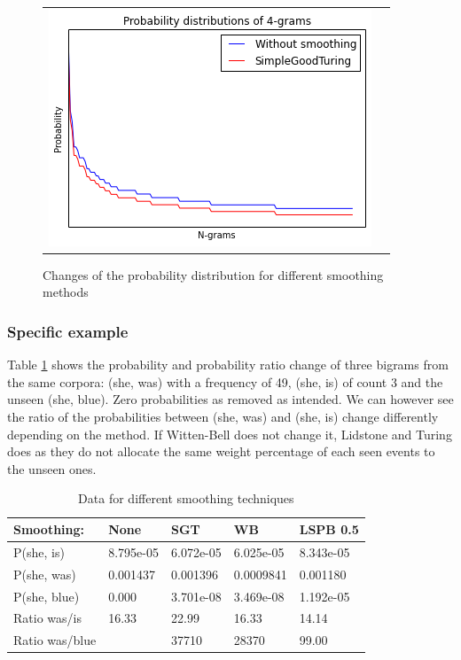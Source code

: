 \documentclass[a4paper,12pt]{article}
\begin{document}
\begin{figure}
\begin{tabular}{cc}
		\includegraphics[width=0.52\linewidth]{4_Turing} \\
	\end{tabular}
	\caption{Changes of the probability distribution for different smoothing methods}
\end{figure}

\subsubsection{Specific example}
	Table \ref{tab:smoothingprobs} shows the probability and probability ratio change of three bigrams from the same corpora: (she, was) with a frequency of 49, (she, is) of count 3 and the unseen (she, blue). Zero probabilities as removed as intended. We can however see the ratio of the probabilities between (she, was) and (she, is) change differently depending on the method. If Witten-Bell does not change it, Lidstone and Turing does as they do not allocate the same weight percentage of each seen events to the unseen ones.


\begin{table}[!h]
\centering
\caption{Data for different smoothing techniques}
\label{tab:smoothingprobs}
\begin{tabular}{@{}lllll@{}}
\toprule
Smoothing:     & None      & SGT       & WB        & LSPB 0.5   \\ \midrule
P(she, is)     & 8.795e-05 & 6.072e-05 & 6.025e-05 & 8.343e-05  \\
P(she, was)    & 0.001437  & 0.001396  & 0.0009841 & 0.001180   \\
P(she, blue)   & 0.000     & 3.701e-08 & 3.469e-08 & 1.192e-05  \\
Ratio was/is   & 16.33     & 22.99     & 16.33     & 14.14      \\
Ratio was/blue &           & 37710     & 28370     & 99.00      \\ \bottomrule
\end{tabular}
\end{table}
\end{document}
